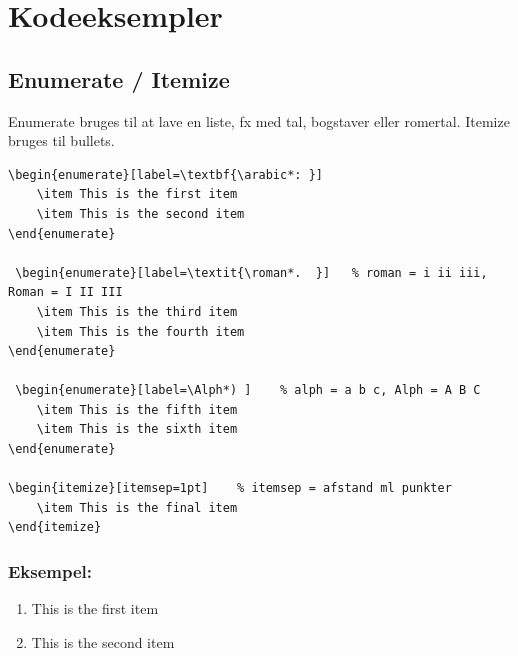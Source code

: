 \chapter{Kodeeksempler}\label{ch:appendix-kodeeksempler}

\section{Enumerate / Itemize}
Enumerate bruges til at lave en liste, fx med tal, bogstaver eller romertal. Itemize bruges til bullets.

\begin{lstlisting}[language=Tex, caption=Her vises enumerate med forskellige formatering af tallet]
 \begin{enumerate}[label=\textbf{\arabic*: }]
    \item This is the first item
    \item This is the second item
\end{enumerate}

 \begin{enumerate}[label=\textit{\roman*.  }]   % roman = i ii iii, Roman = I II III
    \item This is the third item
    \item This is the fourth item
\end{enumerate}

 \begin{enumerate}[label=\Alph*) ]    % alph = a b c, Alph = A B C
    \item This is the fifth item
    \item This is the sixth item
\end{enumerate}

\begin{itemize}[itemsep=1pt]    % itemsep = afstand ml punkter
    \item This is the final item
\end{itemize}
\end{lstlisting}

\subsection{Eksempel:}

 \begin{enumerate}[label=\textbf{\arabic*: }]
    \item This is the first item
    \item This is the second item
\end{enumerate}

